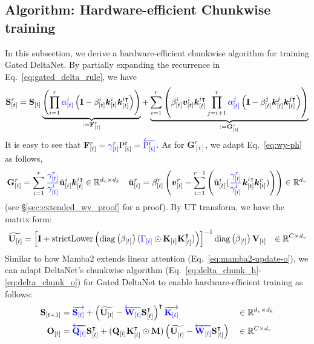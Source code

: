 \documentclass{article}
\def\rmG{{\mathbf{G}}}
\def\rmI{{\mathbf{I}}}
\def\rmK{{\mathbf{K}}}
\def\rmO{{\mathbf{O}}}
\def\rmQ{{\mathbf{Q}}}
\def\rmS{{\mathbf{S}}}
\def\rmU{{\mathbf{U}}}
\def\rmV{{\mathbf{V}}}
\def\rmW{{\mathbf{W}}}
\def\vk{{\bm{k}}}
\def\vu{{\bm{u}}}
\def\vv{{\bm{v}}}
\def\rmU{{\mathbf{U}}}
\def\vu{\mathbf{u}}
\begin{document}
\subsection{Algorithm: Hardware-efficient Chunkwise training}
In this subsection, we derive a hardware-efficient chunkwise algorithm for training Gated DeltaNet. By partially expanding the recurrence in Eq.~\ref{eq:gated_delta_rule}, we have
\begin{align*}
 \rmS_{[t]}^r = \rmS_{[t]} \underbrace{\left(\prod_{i=1}^r 
{\color{blue}{\alpha_{[t]}^i}}\left(\rmI - \beta_{[t]}^i \vk_{[t]}^i \vk_{[t]}^{i\intercal} \right)\right)}_{:= \mathbf{F}_{[t]}^r} + \underbrace{\sum_{i=1}^{r} \left( \beta^i_{[t]} \vv^i_{[t]} \vk_{[t]}^{i\intercal}\prod_{j=i+1}^{r} {\color{blue}{\alpha_{[t]}^j}} \left(\rmI - \beta_{[t]}^j \vk^j_{[t]} \vk_{[t]}^{j\intercal} \right) \right)}_{:= \rmG_{[t]}^r}
\end{align*}
\vspace{-1.5mm}
It is easy to see that $\mathbf{F}_{[t]}^r = {\color{blue}\gamma_{[t]}^r} \rm{P}_{[t]}^r = {\color{blue}\overleftarrow{\rm{P}_{[t]}^r}}$. As for $\rmG_{[t]}^r$, we adapt Eq.~\ref{eq:wy-ph} as follows,
\begin{align*}
\rmG_{[t]}^r = \sum_{i=1}^r {\color{blue} \frac{\gamma_{[t]}^r}{\gamma_{[t]}^i} } \tilde{\vu}_{[t]}^i \vk_{[t]}^{i\intercal} \in\mathbb{R}^{d_v \times d_k}
&&\tilde{\vu}_{[t]}^r = \beta_{[t]}^r \left(\vv_{[t]}^r - \sum_{i=1}^{r-1} \left( \tilde{\vu}_{[t]}^i ({\color{blue}\frac{\gamma_{[t]}^{r}}{\gamma_{[t]}^i}} \vk_{[t]}^{i\intercal}\vk_{[t]}^r)\right)\right) \in \mathbb{R}^{d_v}
\label{eq:wy_recurrent}
\end{align*}
(see \S\ref{sec:extended_wy_proof} for a proof). By UT transform, we have the matrix form:\begin{align*}
\widetilde{\rmU_{[t]}} = \left[\rmI + \operatorname{strictLower} \left(\operatorname{diag}\left(\beta_{[t]}\right) ({\color{blue}\Gamma_{[t]} } \odot \rmK_{[t]} \rmK_{[t]}^\intercal )\right) \right]^{-1} \operatorname{diag}\left(\beta_{[t]}\right) \rmV_{[t]} && \in \mathbb{R}^{C \times d_v}
\end{align*}
Similar to how Mamba2 extends linear attention (Eq.~\ref{eq:mamba2-update-o}), we can adapt DeltaNet's chunkwise algorithm (Eq.~\ref{eq:delta_chunk_h}-\ref{eq:delta_chunk_o}) for Gated DeltaNet to enable hardware-efficient training as follows:
\begin{align*}
\rmS_{[t+1]} &= {\color{blue}  \overrightarrow{\rmS_{[t]}}} +  \left({ \widetilde{\rmU_{[t]}}} - {\color{blue} 
\overleftarrow{\rmW_{[t]}}} \rmS_{[t]}^\intercal\right)^\intercal {\color{blue}
\overrightarrow{\rmK_{[t]}}} &&\in \mathbb{R}^{d_v \times d_k}
\\
    \rmO_{[t]} &= 
    {\color{blue} 
\overleftarrow{\rmQ_{[t]}}}
    \rmS_{[t]}^\intercal + (\rmQ_{[t]} \rmK_{[t]}^{\intercal} \odot \mathbf{M})
\left({{\widetilde{\rmU^{}_{[t]}}}} -  
    {\color{blue}     \overleftarrow{\rmW_{[t]}}}\rmS_{[t]}^\intercal\right) &&\in \mathbb{R}^{C \times d_v}
\end{align*}
\end{document}
